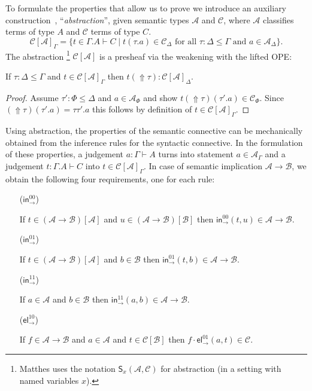 \documentclass[a4paper,USenglish,cleveref, autoref, thm-restate]{lipics-v2021}
\makeatletter
\def\namedlabel#1#2{\begingroup
    #2%
    \def\@currentlabel{#2}%
    \phantomsection\label{#1}\endgroup
}
\newcommand{\tin}{\ensuremath{\mathsf{in}}}
\newcommand{\inn}[2]{\ensuremath{\tin_{#1}^{#2}}}
\newcommand{\tel}{\mathsf{el}}
\newcommand{\el}[2]{\ensuremath{\tel_{#1}^{#2}}}
\newcommand{\A}{\mathcal{A}}
\newcommand{\B}{\mathcal{B}}
\newcommand{\C}{\mathcal{C}}
\newcommand{\Up}{\mathop{\Uparrow}}
\makeatother
\begin{document}
To formulate the properties that allow us to prove  we
introduce an auxiliary construction \fbox{$\C[\A]$}\,, ``\emph{abstraction}'',
given semantic types $\A$ and $\C$, where $\A$ classifies terms of
type $A$ and $\C$ terms of type $C$.
\[
  \C[\A]_\Gamma =
  \{ t \in \Gamma.A \vdash C
     \mid t(\tau.a) \in \C_\Delta
     \mbox{ for all } \tau : \Delta \leq \Gamma
     \mbox{ and } a \in \A_\Delta
  \}
  .
\]
The abstraction%
\footnote{Matthes \cite[Sec.~6.2]{matthes:intersection} uses the
  notation $\mathsf{S}_x(\A,\C)$ for abstraction (in a setting with
  named variables $x$).}
$\C[\A]$ is a presheaf via the weakening with the
lifted OPE:
\begin{lemma}
  If $\tau : \Delta \leq \Gamma$ and $t \in \C[\A]_\Gamma$ then
  $t(\Up\tau) : \C[\A]_\Delta$.
\end{lemma}
\begin{proof}
  Assume $\tau' : \Phi \leq \Delta$ and $a \in \A_\Phi$ and show
  $t(\Up\tau)(\tau'.a) \in \C_\Phi$.  Since $(\Up\tau)(\tau'.a) =
  \tau\tau'.a$ this follows by definition of $t \in \C[\A]_\Gamma$.
\end{proof}

Using abstraction, the properties of the semantic connective can be
mechanically obtained from the inference rules for the syntactic
connective.  In the formulation of these properties, a judgement $a :
\Gamma \vdash A$ turns into statement $a \in \A_\Gamma$ and a
judgement $t : \Gamma.A \vdash C$ into $t \in \C[\A]_\Gamma$.
In case of semantic implication $\A \to \B$, we obtain the following
four requirements, one for each rule:
\begin{itemize}%
\setlength{\itemindent}{2.7em}

\item[\namedlabel{it:in00}{\rm(\inn\to{00})}]
  If $t \in (\A \to \B)[\A]$ and $u \in (\A \to \B)[\B]$ then
  $\inn\to{00}(t,u) \in \A \to \B$.

\item[\namedlabel{it:in01}{\rm(\inn\to{01})}]
  If $t \in (\A \to \B)[\A]$ and $b \in \B$ then
  $\inn\to{01}(t,b) \in \A \to \B$.

\item[\namedlabel{it:in11}{\rm(\inn\to{11})}]
  If $a \in \A$ and $b \in \B$ then $\inn\to{11}(a,b) \in \A \to \B$.

\item[\namedlabel{it:el10}{\rm(\el\to{10})}]
  If $f \in \A \to \B$ and $a \in \A$ and $t \in \C[\B]$ then
  $f \cdot \el\to{01}(a,t) \in \C$.

\end{itemize}
\end{document}
